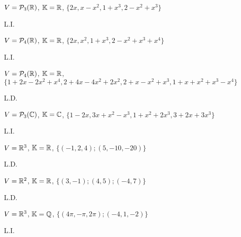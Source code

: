 \documentclass[12pt]{exam}
\begin{document}
    \begin{exercicio}
        $V = \mathcal{P}_3(\mathbb{R})$, $\mathbb{K} = \mathbb{R}$, $\{2x, x - x^2, 1 + x^3, 2 - x^2 + x^3\}$
        \begin{solucao}
            L.I.
        \end{solucao}
    \end{exercicio}

    \begin{exercicio}
        $V = \mathcal{P}_4(\mathbb{R})$, $\mathbb{K} = \mathbb{R}$, $\{2x, x^2, 1 + x^3, 2 - x^2 + x^3 + x^4\}$
        \begin{solucao}
            L.I.
        \end{solucao}
    \end{exercicio}

    \begin{exercicio}
        $V = \mathcal{P}_4(\mathbb{R})$, $\mathbb{K} = \mathbb{R}$, $\{1 + 2x - 2x^2 + x^4, 2 + 4x - 4x^2 + 2x^2, 2 + x - x^2 + x^3, 1 + x + x^2 + x^3 - x^4\}$
        \begin{solucao}
            L.D.
        \end{solucao}
    \end{exercicio}
 
    \begin{exercicio}
        $V = \mathcal{P}_3(\mathbb{C})$, $\mathbb{K} = \mathbb{C}$, $\{1 - 2x, 3x + x^2 - x^3, 1 + x^2 + 2x^3, 3 + 2x + 3x^3\}$
        \begin{solucao}
            L.I.
        \end{solucao}
    \end{exercicio}

    \begin{exercicio}
        $V = \mathbb{R}^3$, $\mathbb{K} = \mathbb{R}$, $\{(-1, 2, 4); (5, -10, -20)\}$
        \begin{solucao}
            L.D.
        \end{solucao}
    \end{exercicio}
    
    \begin{exercicio}
        $V = \mathbb{R}^2$, $\mathbb{K} = \mathbb{R}$, $\{(3, -1); (4, 5); (-4, 7)\}$
        \begin{solucao}
            L.D.
        \end{solucao}
    \end{exercicio}

    \begin{exercicio}
        $V = \mathbb{R}^3$, $\mathbb{K} = \mathbb{Q}$, $\{(4\pi, -\pi, 2\pi); (-4, 1, -2)\}$
        \begin{solucao}
            L.I.
        \end{solucao}
    \end{exercicio}
\end{document}
